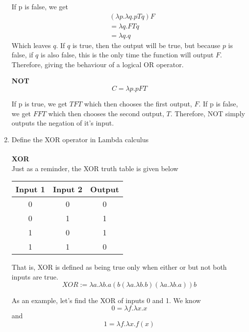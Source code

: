 \documentclass{article}
\begin{document}
\begin{enumerate}
    If p is false, we get
    \begin{align}
        & (\lambda p.\lambda q.pTq)F \\
        &= \lambda q.FTq \\
        &= \lambda q.q
    \end{align}
    Which leaves \(q\). If \(q\) is true, then the output will be true, but because \(p\) is false, if \(q\) is also false, this is the only time the function will output \(F\). Therefore, giving the behaviour of a logical OR operator.
    
    \bigskip
    \Large \textbf{NOT}\\
    \normalsize
    \[C = \lambda p.pFT\]

    If p is true, we get \(TFT\) which then chooses the first output, \(F\).
    If p is false, we get \(FFT\) which then chooses the second output, \(T\).
    Therefore, NOT simply outputs the negation of it's input.

    \newpage
    \color{black}
    \item Define the XOR operator in Lambda calculus\\
    \\
    \color{blue}
    \Large \textbf{XOR}\\
    \normalsize
    Just as a reminder, the XOR truth table is given below
    \begin{center}
        \begin{tabular}{ |c|c||c| }
        \hline
        \textbf{Input 1} & \textbf{Input 2} & \textbf{Output} \\
        \hline
        0 & 0 & 0 \\
        0 & 1 & 1 \\
        1 & 0 & 1 \\
        1 & 1 & 0 \\
        \hline
        \end{tabular}
    \end{center}

    That is, XOR is defined as being true only when either or but not both inputs are true.
    \[XOR:= \lambda a.\lambda b.a \left(b (\lambda a.\lambda b.b) (\lambda a.\lambda b.a)\right) b\]

    As an example, let's find the XOR of inputs 0 and 1. We know
    \[0 = \lambda f.\lambda x.x\]
    and
    \[1 = \lambda f.\lambda x.f(x)\]


\end{enumerate}
\end{document}
